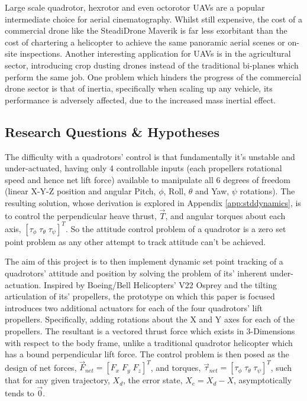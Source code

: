 \par
Large scale quadrotor, hexrotor and even octorotor UAVs are a popular intermediate choice for aerial cinematography.  Whilst still expensive, the cost of a commercial drone like the SteadiDrone Maverik \cite{steadidrone} is far less exorbitant than the cost of chartering a helicopter to achieve the same panoramic aerial scenes or on-site inspections. Another interesting application for UAVs is in the agricultural sector, introducing crop dusting drones instead of the traditional bi-planes which perform the same job. One problem which hinders the progress of the commercial drone sector is that of inertia, specifically when scaling up any vehicle, its performance is adversely affected, due to the increased mass inertial effect.
\subsection{Research Questions \& Hypotheses}
\label{subsec:intro.foreward.hypotheses}
The difficulty with a quadrotors' control is that fundamentally it's unstable and under-actuated, having only 4 controllable inputs (each propellers rotational speed and hence net lift force) available to manipulate all 6 degrees of freedom (linear X-Y-Z position and angular Pitch, $\phi$, Roll, $\theta$ and Yaw, $\psi$ rotations). The resulting solution, whose derivation is explored in Appendix \ref{app:stddynamics}, is to control the perpendicular heave thrust, $\vec{T}$, and angular torques about each axis, $[\tau_\phi\;\tau_\theta\;\tau_\psi]^T$. So the attitude control problem of a quadrotor is a zero set point problem as any other attempt to track attitude can't be achieved.
\par
The aim of this project is to then implement dynamic set point tracking of a quadrotors' attitude and position by solving the problem of its' inherent under-actuation. Inspired by Boeing/Bell Helicopters' V22 Osprey and the tilting articulation of its' propellers, the prototype on which this paper is focused introduces two additional actuators for each of the four quadrotors' lift propellers. Specifically, adding rotations about the X and Y axes for each of the propellers. The resultant is a vectored thrust force which exists in 3-Dimensions with respect to the body frame, unlike a traditional quadrotor helicopter which has a bound perpendicular lift force. The control problem is then posed as the design of net forces, $\vec{F}_{net} = [F_x\;F_y\;F_z]^T$, and torques, $\vec{\tau}_{net} = [\tau_{\phi}\;\tau_{\theta}\;\tau_{\psi}]^T$, such that for any given trajectory, $X_d$, the error state, $X_e = X_d - X$, asymptotically tends to $\vec{0}$.
